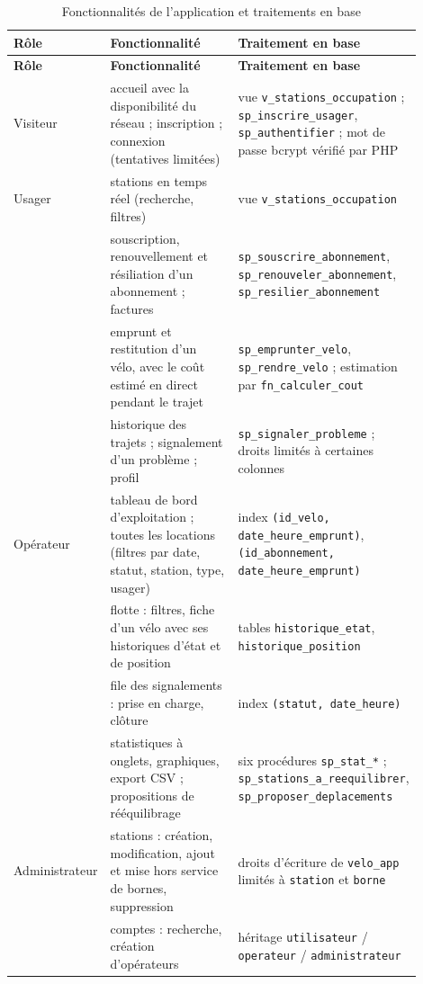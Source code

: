 {\small
\begin{longtable}{>{\raggedright\arraybackslash}p{0.16\linewidth} >{\raggedright\arraybackslash}p{0.38\linewidth} >{\raggedright\arraybackslash}p{0.36\linewidth}}
	\caption{Fonctionnalités de l'application et traitements en base}\label{tab:fonctionnalites}\\
	\toprule
	\textbf{Rôle} & \textbf{Fonctionnalité} & \textbf{Traitement en base} \\
	\midrule\endfirsthead
	\toprule
	\textbf{Rôle} & \textbf{Fonctionnalité} & \textbf{Traitement en base} \\
	\midrule\endhead
	\bottomrule\endlastfoot
	Visiteur & accueil avec la disponibilité du réseau ; inscription ; connexion (tentatives limitées) & vue \texttt{v\_stations\_occupation} ; \texttt{sp\_inscrire\_usager}, \texttt{sp\_authentifier} ; mot de passe bcrypt vérifié par PHP \\
	\midrule
	Usager & stations en temps réel (recherche, filtres) & vue \texttt{v\_stations\_occupation} \\
	& souscription, renouvellement et résiliation d'un abonnement ; factures & \texttt{sp\_souscrire\_abonnement}, \texttt{sp\_renouveler\_abonnement}, \texttt{sp\_resilier\_abonnement} \\
	& emprunt et restitution d'un vélo, avec le coût estimé en direct pendant le trajet & \texttt{sp\_emprunter\_velo}, \texttt{sp\_rendre\_velo} ; estimation par \texttt{fn\_calculer\_cout} \\
	& historique des trajets ; signalement d'un problème ; profil & \texttt{sp\_signaler\_probleme} ; droits limités à certaines colonnes \\
	\midrule
	Opérateur & tableau de bord d'exploitation ; toutes les locations (filtres par date, statut, station, type, usager) & index \texttt{(id\_velo, date\_heure\_emprunt)}, \texttt{(id\_abonnement, date\_heure\_emprunt)} \\
	& flotte : filtres, fiche d'un vélo avec ses historiques d'état et de position & tables \texttt{historique\_etat}, \texttt{historique\_position} \\
	& file des signalements : prise en charge, clôture & index \texttt{(statut, date\_heure)} \\
	& statistiques à onglets, graphiques, export CSV ; propositions de rééquilibrage & six procédures \texttt{sp\_stat\_*} ; \texttt{sp\_stations\_a\_reequilibrer}, \texttt{sp\_proposer\_deplacements} \\
	\midrule
	Administrateur & stations : création, modification, ajout et mise hors service de bornes, suppression & droits d'écriture de \texttt{velo\_app} limités à \texttt{station} et \texttt{borne} \\
	& comptes : recherche, création d'opérateurs & héritage \texttt{utilisateur} / \texttt{operateur} / \texttt{administrateur} \\
\end{longtable}
}

